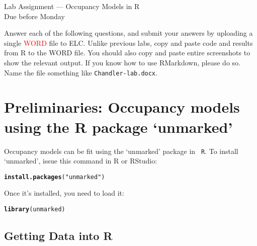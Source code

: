 \documentclass[12pt]{article}\usepackage[]{graphicx}\usepackage[]{xcolor}
\makeatletter
\newcommand{\hlstr}[1]{\textcolor[rgb]{0.192,0.494,0.8}{#1}}%
\newcommand{\hlstd}[1]{\textcolor[rgb]{0.345,0.345,0.345}{#1}}%
\newcommand{\hlkwd}[1]{\textcolor[rgb]{0.737,0.353,0.396}{\textbf{#1}}}%
\newenvironment{kframe}{%
 \def\at@end@of@kframe{}%
 \ifinner\ifhmode%
  \def\at@end@of@kframe{\end{minipage}}%
  \begin{minipage}{\columnwidth}%
 \fi\fi%
 \def\FrameCommand##1{\hskip\@totalleftmargin \hskip-\fboxsep
 \colorbox{shadecolor}{##1}\hskip-\fboxsep
     \hskip-\linewidth \hskip-\@totalleftmargin \hskip\columnwidth}%
 \MakeFramed {\advance\hsize-\width
   \@totalleftmargin\z@ \linewidth\hsize
   \@setminipage}}%
 {\par\unskip\endMakeFramed%
 \at@end@of@kframe}
\newenvironment{knitrout}{}{} %
\makeatother
\begin{document}
{
  \Large
  \centering
  Lab Assignment --- Occupancy Models in R \\
  Due before Monday \par
}

\vspace{10pt}


Answer each of the following questions, and submit your answers by 
uploading a single \textcolor{red}{WORD} file to ELC. Unlike previous labs,
copy and paste code and results from R to the WORD file. You should
also copy and paste entire screenshots to show the relevant output. If
you know how to use RMarkdown, please do so. Name the file something
like \texttt{Chandler-lab.docx}.




\section*{\normalsize Preliminaries: Occupancy models using the R
package `unmarked'}


Occupancy models can be fit using the `unmarked' package in {\tt
R}. To install `unmarked', issue this command in R or RStudio: 

\begin{knitrout}
\color{fgcolor}\begin{kframe}
\begin{alltt}
\hlkwd{install.packages}\hlstd{(}\hlstr{"unmarked"}\hlstd{)}
\end{alltt}
\end{kframe}
\end{knitrout}

Once it's installed, you need to load it:

\begin{knitrout}
\color{fgcolor}\begin{kframe}
\begin{alltt}
\hlkwd{library}\hlstd{(unmarked)}
\end{alltt}
\end{kframe}
\end{knitrout}



\subsection*{\normalsize Getting Data into R}
\vspace{-10pt}
\end{document}

